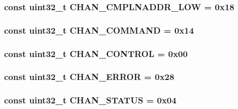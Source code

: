 \label{namespaceCopyEngineReg_ab4915d1760e85a49bed54729ef4fffc7}
\hypertarget{namespaceCopyEngineReg_aed6b52e6711d8697ca3ceb779ec2d9fc}{
\subsubsection[{CHAN\_\-CMPLNADDR\_\-LOW}]{\setlength{\rightskip}{0pt plus 5cm}const {\bf uint32\_\-t} {\bf CHAN\_\-CMPLNADDR\_\-LOW} = 0x18}}
\label{namespaceCopyEngineReg_aed6b52e6711d8697ca3ceb779ec2d9fc}
\hypertarget{namespaceCopyEngineReg_ae8c00cf31e7ee4497a99b60a2a1f1940}{
\subsubsection[{CHAN\_\-COMMAND}]{\setlength{\rightskip}{0pt plus 5cm}const {\bf uint32\_\-t} {\bf CHAN\_\-COMMAND} = 0x14}}
\label{namespaceCopyEngineReg_ae8c00cf31e7ee4497a99b60a2a1f1940}
\hypertarget{namespaceCopyEngineReg_ae83d13e861450d7a551762efdf316422}{
\subsubsection[{CHAN\_\-CONTROL}]{\setlength{\rightskip}{0pt plus 5cm}const {\bf uint32\_\-t} {\bf CHAN\_\-CONTROL} = 0x00}}
\label{namespaceCopyEngineReg_ae83d13e861450d7a551762efdf316422}
\hypertarget{namespaceCopyEngineReg_a82b064c0570a1fb91a35538dd0a6cacf}{
\subsubsection[{CHAN\_\-ERROR}]{\setlength{\rightskip}{0pt plus 5cm}const {\bf uint32\_\-t} {\bf CHAN\_\-ERROR} = 0x28}}
\label{namespaceCopyEngineReg_a82b064c0570a1fb91a35538dd0a6cacf}
\hypertarget{namespaceCopyEngineReg_a76cf8c497537b1f830ed57b4bfeb4c04}{
\subsubsection[{CHAN\_\-STATUS}]{\setlength{\rightskip}{0pt plus 5cm}const {\bf uint32\_\-t} {\bf CHAN\_\-STATUS} = 0x04}}
